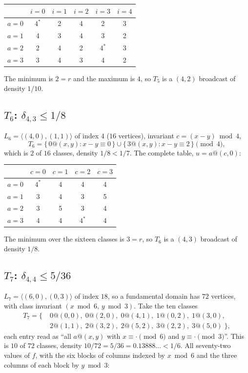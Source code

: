 \documentclass[11pt]{amsart}
\theoremstyle{definition}
\begin{document}
\smallskip
\noindent
\begin{tabular}{r|ccccc}
 & $i=0$ & $i=1$ & $i=2$ & $i=3$ & $i=4$\\
\hline
$a=0$ & $4^{\ast}$ & 2 & 4 & 2 & 3\\
$a=1$ & 4 & 3 & 4 & 3 & 2\\
$a=2$ & 2 & 4 & 2 & $4^{\ast}$ & 3\\
$a=3$ & 3 & 4 & 3 & 4 & 2
\end{tabular}
\smallskip

\noindent
The minimum is $2=r$ and the maximum is $4$, so $T_5$ is a $(4,2)$ broadcast of density $1/10$.

\subsection*{$T_6$: $\delta_{4,3}\leq 1/8$}
$L_6=\langle(4,0),(1,1)\rangle$ of index $4$ ($16$ vertices), invariant $c=(x-y)\bmod 4$,
\[
  T_6=\bigl\{\,0@(x,y):x-y\equiv 0\,\bigr\}\cup\bigl\{\,3@(x,y):x-y\equiv 2\,\bigr\}\pmod 4,
\]
which is $2$ of $16$ classes, density $1/8<1/7$. The complete table, $u=a@(c,0)$:

\smallskip
\noindent
\begin{tabular}{r|cccc}
 & $c=0$ & $c=1$ & $c=2$ & $c=3$\\
\hline
$a=0$ & $4^{\ast}$ & 4 & 4 & 4\\
$a=1$ & 3 & 4 & 3 & 5\\
$a=2$ & 3 & 5 & 3 & 4\\
$a=3$ & 4 & 4 & $4^{\ast}$ & 4
\end{tabular}
\smallskip

\noindent
The minimum over the sixteen classes is $3=r$, so $T_6$ is a
$(4,3)$ broadcast of density $1/8$.

\subsection*{$T_7$: $\delta_{4,4}\leq 5/36$}
$L_7=\langle(6,0),(0,3)\rangle$ of index $18$, so a fundamental domain has $72$ vertices, with
class invariant $(x\bmod 6,\,y\bmod 3)$. Take the ten classes
\begin{align*}
  T_7=\bigl\{\;&0@(0,0),\;0@(2,0),\;0@(4,1),\;1@(0,2),\;1@(3,0),\\
               &2@(1,1),\;2@(3,2),\;2@(5,2),\;3@(2,2),\;3@(5,0)\;\bigr\},
\end{align*}
each entry read as ``all $a@(x,y)$ with $x\equiv\cdot\pmod 6$ and $y\equiv\cdot\pmod 3$''. This
is $10$ of $72$ classes, density $10/72=5/36=0.13888\ldots<1/6$. All seventy-two values of $f$,
with the six blocks of columns indexed by $x\bmod 6$ and the three columns of each block by
$y\bmod 3$:
\end{document}
